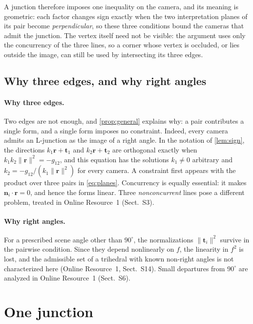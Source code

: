 \documentclass[pdflatex,sn-mathphys-num,iicol]{sn-jnl}
\newcommand{\vr}{\mathbf{r}}
\newcommand{\vt}{\mathbf{t}}
\newcommand{\vn}{\mathbf{n}}
\newcommand{\OR}{Online Resource~1}
\theoremstyle{thmstyleone}
\theoremstyle{thmstylethree}
\theoremstyle{thmstyletwo}
\begin{document}
\noindent A junction therefore imposes one inequality on the camera, and its meaning is geometric: each factor changes sign exactly when the two interpretation planes of its pair become \emph{perpendicular}, so these three conditions bound the cameras that admit the junction. The vertex itself need not be visible: the argument uses only the concurrency of the three lines, so a corner whose vertex is occluded, or lies outside the image, can still be used by intersecting its three edges. 

\subsection{Why three edges, and why right angles}\label{sec:why}

\paragraph{Why three edges.} Two edges are not enough, and \cref{prop:general} explains why: a pair contributes a single form, and a single form imposes no constraint. Indeed, every camera admits an L-junction as the image of a right angle. In the notation of \cref{lem:sign}, the directions $k_1\vr+\vt_1$ and $k_2\vr+\vt_2$ are orthogonal exactly when $k_1k_2\|\vr\|^2=-g_{12}$, and this equation has the solutions $k_1\neq0$ arbitrary and $k_2=-g_{12}/(k_1\|\vr\|^2)$ for every camera. A constraint first appears with the product over three pairs in \eqref{eq:planes}. Concurrency is equally essential: it makes $\vn_i\cdot\vr=0$, and hence the forms linear. Three \emph{nonconcurrent} lines pose a different problem, treated in \OR{} (Sect.~S3).

\paragraph{Why right angles.} For a prescribed scene angle other than $90^\circ$, the normalizations $\|\vt_i\|^2$ survive in the pairwise condition. Since they depend nonlinearly on $f$, the linearity in $f^2$ is lost, and the admissible set of a trihedral with known non-right angles is not characterized here (\OR, Sect.~S14). Small departures from $90^\circ$ are analyzed in \OR{} (Sect.~S6).

\section{One junction}\label{sec:bound}
\end{document}
